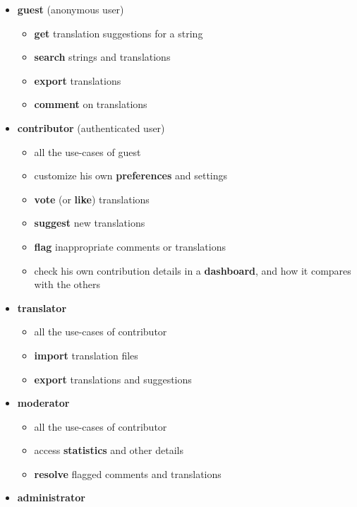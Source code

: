 \documentclass[11pt]{article}
\begin{document}
\begin{itemize}
\item \textbf{guest} (anonymous user)

\begin{itemize}
\item \textbf{get} translation suggestions for a string
\item \textbf{search} strings and translations
\item \textbf{export} translations
\item \textbf{comment} on translations
\end{itemize}

\item \textbf{contributor} (authenticated user)

\begin{itemize}
\item all the use-cases of guest
\item customize his own \textbf{preferences} and settings
\item \textbf{vote} (or \textbf{like}) translations
\item \textbf{suggest} new translations
\item \textbf{flag} inappropriate comments or translations
\item check his own contribution details in a \textbf{dashboard}, and how it
       compares with the others
\end{itemize}

\item \textbf{translator}

\begin{itemize}
\item all the use-cases of contributor
\item \textbf{import} translation files
\item \textbf{export} translations and suggestions
\end{itemize}

\item \textbf{moderator}

\begin{itemize}
\item all the use-cases of contributor
\item access \textbf{statistics} and other details
\item \textbf{resolve} flagged comments and translations
\end{itemize}

\item \textbf{administrator}


\end{itemize}
\end{document}
